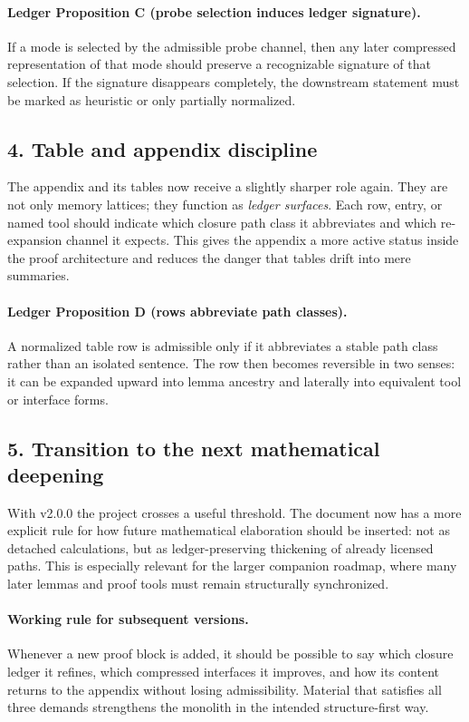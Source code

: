 \paragraph{Ledger Proposition C (probe selection induces ledger signature).}
If a mode is selected by the admissible probe channel, then any later compressed
representation of that mode should preserve a recognizable signature of that
selection. If the signature disappears completely, the downstream statement must
be marked as heuristic or only partially normalized.

\subsection*{4. Table and appendix discipline}
The appendix and its tables now receive a slightly sharper role again. They are
not only memory lattices; they function as \emph{ledger surfaces}. Each row,
entry, or named tool should indicate which closure path class it abbreviates and
which re-expansion channel it expects. This gives the appendix a more active
status inside the proof architecture and reduces the danger that tables drift
into mere summaries.

\paragraph{Ledger Proposition D (rows abbreviate path classes).}
A normalized table row is admissible only if it abbreviates a stable path class
rather than an isolated sentence. The row then becomes reversible in two senses:
it can be expanded upward into lemma ancestry and laterally into equivalent tool
or interface forms.

\subsection*{5. Transition to the next mathematical deepening}
With v2.0.0 the project crosses a useful threshold. The document now has a
more explicit rule for how future mathematical elaboration should be inserted:
not as detached calculations, but as ledger-preserving thickening of already
licensed paths. This is especially relevant for the larger companion roadmap,
where many later lemmas and proof tools must remain structurally synchronized.

\paragraph{Working rule for subsequent versions.}
Whenever a new proof block is added, it should be possible to say which closure
ledger it refines, which compressed interfaces it improves, and how its content
returns to the appendix without losing admissibility. Material that satisfies
all three demands strengthens the monolith in the intended structure-first way.


\clearpage
